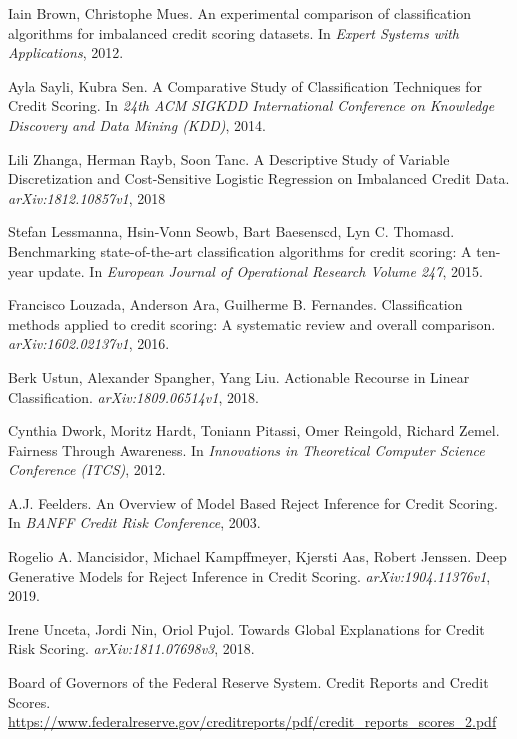 \documentclass{article}
\begin{document}

\begin{thebibliography}{99}


Iain Brown, Christophe Mues.
An experimental comparison of classification algorithms for imbalanced credit scoring datasets.
In {\em Expert Systems with Applications}, 2012.

Ayla Sayli, Kubra Sen.
A Comparative Study of Classification Techniques for Credit Scoring.
In {\em 24th ACM SIGKDD International Conference on Knowledge Discovery and Data Mining (KDD)}, 2014.

Lili Zhanga, Herman Rayb, Soon Tanc.
A Descriptive Study of Variable Discretization and Cost-Sensitive Logistic Regression on Imbalanced Credit Data.
{\em arXiv:1812.10857v1}, 2018

Stefan Lessmanna, Hsin-Vonn Seowb, Bart Baesenscd, Lyn C. Thomasd.
Benchmarking state-of-the-art classification algorithms for credit scoring: A ten-year update.
In {\em European Journal of Operational Research Volume 247}, 2015.

Francisco Louzada, Anderson Ara, Guilherme B. Fernandes.
Classification methods applied to credit scoring: A systematic review and overall comparison.
{\em arXiv:1602.02137v1}, 2016.

Berk Ustun, Alexander Spangher, Yang Liu.
Actionable Recourse in Linear Classification.
{\em arXiv:1809.06514v1}, 2018.

Cynthia Dwork, Moritz Hardt, Toniann Pitassi, Omer Reingold, Richard Zemel.
Fairness Through Awareness.
In {\em Innovations in Theoretical Computer Science Conference (ITCS)}, 2012.

A.J. Feelders.
An Overview of Model Based Reject Inference for Credit Scoring.
In {\em BANFF Credit Risk Conference}, 2003.

Rogelio A. Mancisidor, Michael Kampffmeyer, Kjersti Aas, Robert Jenssen.
Deep Generative Models for Reject Inference in Credit Scoring.
{\em arXiv:1904.11376v1}, 2019.

Irene Unceta, Jordi Nin, Oriol Pujol.
Towards Global Explanations for Credit Risk Scoring.
{\em arXiv:1811.07698v3}, 2018.

Board of Governors of the Federal Reserve System.
Credit Reports and Credit Scores.
\url{https://www.federalreserve.gov/creditreports/pdf/credit_reports_scores_2.pdf}


\end{thebibliography}
\end{document}
